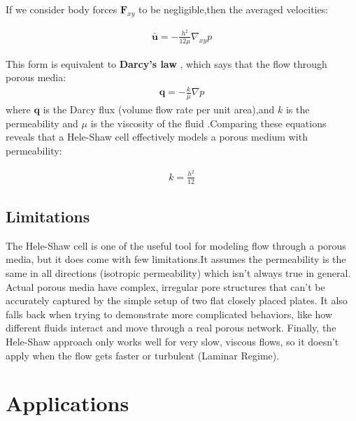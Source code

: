 \documentclass[12pt,a4paper]{article}
\begin{document}
If we consider body forces $\mathbf{F}_{xy}$ to be negligible,then the averaged velocities:
\begin{mdframed}[linewidth=0.5pt]
\begin{align}
    \bar{\mathbf{u}} = -\frac{h^2}{12\mu}\nabla_{xy} p 
\end{align}
\end{mdframed}





This form is equivalent to\textbf{ Darcy's law} \cite{Whitaker1986}, which says that the flow through porous media:
\begin{align}
    \mathbf{q} = -\frac{k}{\mu}\nabla p
\end{align}
where $\mathbf{q}$ is the Darcy flux (volume flow rate per unit area),and  $k$ is the permeability and $\mu$ is the viscosity of the fluid .Comparing these equations reveals that a Hele-Shaw cell effectively models a porous medium with permeability:
\begin{mdframed}
  \begin{align}
    k = \frac{h^2}{12}
\end{align}  
\end{mdframed}

\subsection{Limitations}
The Hele-Shaw cell is one of the useful tool for modeling flow through a porous media, but it does come with few limitations.It assumes the permeability is the same in all directions (isotropic permeability) which isn’t always true in general. Actual porous media have complex, irregular pore structures that can’t be accurately captured by the simple setup of two flat closely placed plates. It also falls back when trying to demonstrate more complicated behaviors, like how different fluids interact and move through a real porous network. Finally, the Hele-Shaw approach only works well for very slow, viscous flows, so it doesn't apply when the flow gets faster or turbulent (Laminar Regime).


\section{Applications}
\end{document}
